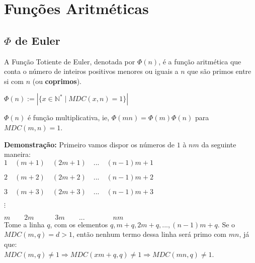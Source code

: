 
\chapter{Funções Aritméticas} %

\label{Chapter3} %


\section{$\Phi$ de Euler}

\begin{definition}
A Função Totiente de Euler, denotada por $\Phi(n)$, é a função aritmética que conta o número 
de inteiros positivos menores ou iguais a $n$ que são primos entre si com $n$ (ou \textbf{coprimos}).

$\Phi(n) := |\{ x \in \mathbb{N}^{*} \mid MDC(x,n) = 1 \}|$
\end{definition}



\begin{theorem}\label{phi_multiplicativa}
$\Phi(n)$ é função multiplicativa, ie, $\Phi(mn) = \Phi(m)\Phi(n)$ para $MDC(m,n) = 1$.
\end{theorem}
\textbf{Demonstração:}
Primeiro vamos dispor os números de $1$ à $nm$ da seguinte maneira:\\

$1\quad(m+1)\quad(2m+1)\quad...\quad(n-1)m+1$

$2\quad(m+2)\quad(2m+2)\quad...\quad(n-1)m+2$

$3\quad(m+3)\quad(2m+3)\quad...\quad(n-1)m+3$

$\vdots$

$m\quad\quad2m\quad\quad\quad3m\quad\quad...\quad\quad\quad\quad{nm}$\\

Tome a linha $q$, com os elementos $q,m+q,2m+q,...,(n-1)m+q$. Se o $MDC(m,q) = d > 1$, então nenhum termo dessa linha será primo com
$mn$, já que: 
\\

$MDC(m,q) \neq 1 \Rightarrow MDC(xm+q,q) \neq 1 \Rightarrow MDC(mn,q) \neq 1$.
\newline

